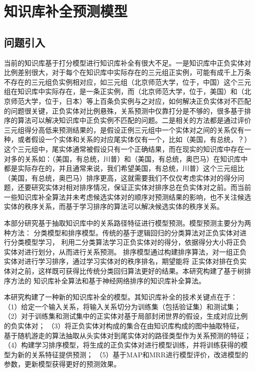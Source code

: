 

\chapter{知识库补全预测模型}
\label{cha:kbc-rank}


\section{问题引入}
当前的知识库基于打分模型进行知识库补全有很大不足。一是知识库中正负实体对比例差别很大，对于每个在知识库中实际存在的三元组正实例，可能有成千上万条不存在的三元组负实例相对应，如三元组（北京师范大学，位于，中国）这个三元组在知识库中实际存在，是一条正实例，而（北京师范大学，位于，美国）和（北京师范大学，位于，日本）等上百条负实例与之对应，如何解决正负实体对不匹配的问题很关键，正负实体对比例悬殊，关系预测中仅靠打分是不够的，很多基于排序的算法可以解决知识库中正负实例不匹配的问题。二是相关的方法都是通过评价三元组得分高低来预测结果的，是假设正例三元组中一个实体对之间的关系仅有一种，或者假设一个实体和关系的对应尾实体仅有一个，比如（美国，有总统，？）这个三元组中，尾实体通常被假设只有一个正确结果，而在现实的知识库中存在一对多的关系如：（美国，有总统，川普）和（美国，有总统，奥巴马）在知识库中都是实际存在的，并且通常来说，我们希望美国，有总统，川普）这个三元组比（美国，有总统，奥巴马）排序更高，这就需要我们不仅仅考虑实体对的得分问题，还要研究实体对相对排序情况，保证正实体对排序总在负实体对之前。而当前一些知识库补全算法并未考虑候选实体对的顺序对预测结果的影响，也不关注候选实体的秩序关系，而基于学习排序的算法可以解决候选实体的秩序关系。

本部分研究基于抽取知识库中的关系路径特征进行模型预测。模型预测主要分为两种方法：
分类模型和排序模型。传统的基于逻辑回归的分类算法对正负实体对进行分类模型学习，
利用二分类算法学习正负实体对的得分，依据得分大小将正负实体对进行划分，从而进行关系预测。
排序模型通过构建排序算法，对一组正负实体对进行学习排序，通过学习实体对的秩序排名，期望能将
正实体对排在负实体对之前，这样既可获得比传统分类回归算法更好的结果。本研究构建了基于树排序方法的
知识库补全算法和基于神经网络排序的知识库补全算法。

本研究构建了一种新的知识库补全的模型。其知识库补全的技术关键点在于：
（1）给定一个输入关系，将输入关系切分为训练集（包括验证集）和测试集；
（2）对于训练集和测试集中的正实体对基于局部封闭世界的假设，生成对应比例的负实体对；
（3）将正负实体对构成的集合在由知识库构成的图中抽取特征，
基于随机游走的算法抽取从头实体对到尾实体对的路径类型作为关系预测的特征；
（4）构建学习排序模型，将生成的正负实体对进行模型训练，并将训练获得的模型为新的关系特征提供预测；
（5）基于MAP和MRR进行模型评价，改进模型的参数，更新模型获得更好的预测效果。

